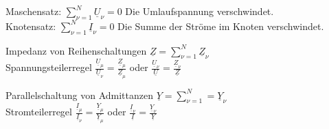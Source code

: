 \documentclass[german]{article}
\begin{document}
Maschensatz: $\sum_{\nu = 1}^N \underline{U}_\nu = 0$ Die Umlaufspannung verschwindet. \\
Knotensatz: $\sum_{\nu = 1}^N \underline{I}_\nu = 0$ Die Summe der Ströme im Knoten verschwindet.

Impedanz von Reihenschaltungen $\underline{Z} = \sum_{\nu = 1}^N \underline{Z}_\nu$ \\
Spannungsteilerregel $\frac{\underline{U}_{\mu}}{\underline{U}_{\nu}} = \frac{\underline{Z}_{\mu}}{\underline{Z}_{\mu}}$ oder $\frac{\underline{U}_{\nu}}{\underline{U}} = \frac{\underline{Z}_{\nu}}{\underline{Z}}$

Parallelschaltung von Admittanzen $\underline{Y} = \sum_{\nu = 1}^N = \underline{Y}_\nu$ \\
Stromteilerregel $\frac{\underline{I}_{\mu}}{\underline{I}_{\nu}} = \frac{\underline{Y}_{\mu}}{\underline{Y}_{\mu}}$ oder $\frac{\underline{I}_{\nu}}{\underline{I}} = \frac{\underline{Y}_{\nu}}{\underline{Y}}$
\end{document}
